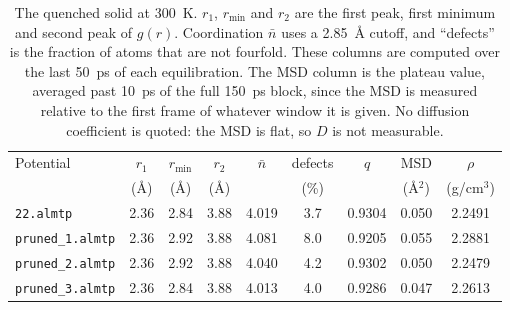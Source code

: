 \documentclass{article}
\begin{document}
\begin{table}[H]
    \centering
    \small
    \begin{tabular}{l|c|c|c|c|c|c|c|c}
        \toprule
        Potential & $r_1$ & $r_{\min}$ & $r_2$ & $\bar{n}$ & defects & $q$ & MSD & $\rho$ \\
        & (\AA) & (\AA) & (\AA) & & (\%) & & (\AA$^2$) & (g/cm$^3$) \\
        \midrule
        \texttt{22.almtp}        & 2.36 & 2.84 & 3.88 & 4.019 & 3.7 & 0.9304 & 0.050 & 2.2491 \\
        \texttt{pruned\_1.almtp} & 2.36 & 2.92 & 3.88 & 4.081 & 8.0 & 0.9205 & 0.055 & 2.2881 \\
        \texttt{pruned\_2.almtp} & 2.36 & 2.92 & 3.88 & 4.040 & 4.2 & 0.9302 & 0.050 & 2.2479 \\
        \texttt{pruned\_3.almtp} & 2.36 & 2.84 & 3.88 & 4.013 & 4.0 & 0.9286 & 0.047 & 2.2613 \\
        \bottomrule
    \end{tabular}
    \caption{The quenched solid at 300~K. $r_1$, $r_{\min}$ and $r_2$ are the first peak, first minimum and second peak of $g(r)$. Coordination $\bar{n}$ uses a 2.85~\AA{} cutoff, and ``defects'' is the fraction of atoms that are not fourfold. These columns are computed over the last 50~ps of each equilibration. The MSD column is the plateau value, averaged past 10~ps of the full 150~ps block, since the MSD is measured relative to the first frame of whatever window it is given. No diffusion coefficient is quoted: the MSD is flat, so $D$ is not measurable.}
    \label{tab:quench_structural}
\end{table}
\end{document}
